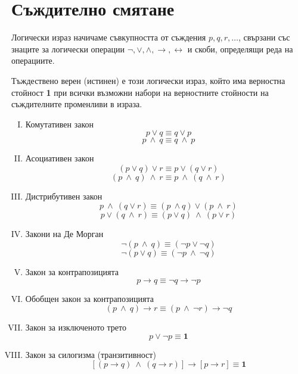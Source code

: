 \section*{Съждително смятане}


\begin{dfn}
  Логически израз начичаме съвкупността от съждения $p,q,r,\dots$, свързани със знаците за логически операции
  $\neg, \vee, \wedge, \rightarrow, \leftrightarrow$ и скоби, определящи реда на операциите.
\end{dfn}

\begin{dfn}
  Тъждествено верен (истинен) е този логически израз, който има верностна стойност {\bf 1} при всички възможни набори на
  верностните стойности на съждителните променливи в израза.
\end{dfn}

\begin{enumerate}[I)]
  \item
    Комутативен закон
    \[p\vee q \equiv q\vee p\] 
    \[p\ \wedge\ q \equiv q\ \wedge\ p\]
  \item
    Асоциативен закон
    \[(p\vee q)\vee r \equiv p\vee(q\vee r)\]
    \[(p\ \wedge\ q)\ \wedge\ r \equiv p\ \wedge\ (q\ \wedge\ r)\]
  \item
    Дистрибутивен закон
    \[p\ \wedge\ (q \vee r) \equiv (p\ \wedge q)\vee (p\ \wedge\ r)\]
    \[p\vee (q\ \wedge\ r) \equiv (p\vee q)\ \wedge\ (p\vee r)\]
  \item
    Закони на Де Морган
    \[\neg(p\ \wedge\ q) \equiv (\neg p \vee \neg q)\]
    \[\neg(p\vee q) \equiv (\neg p\ \wedge\ \neg q)\]
  \item
    Закон за контрапозицията
    \[p\rightarrow q \equiv \neg q \rightarrow \neg p\]
  \item
    Обобщен закон за контрапозицията
    \[(p\ \wedge\ q)\rightarrow r \equiv (p\ \wedge\ \neg r) \rightarrow \neg q\]
  \item
    Закон за изключеното трето
    \[p\vee \neg p \equiv {\mathbf 1}\]
  \item
    Закон за силогизма (транзитивност)
    \[[(p\rightarrow q)\ \wedge\ (q\rightarrow r)] \rightarrow [p\rightarrow r] \equiv {\mathbf 1}\]
\end{enumerate}

